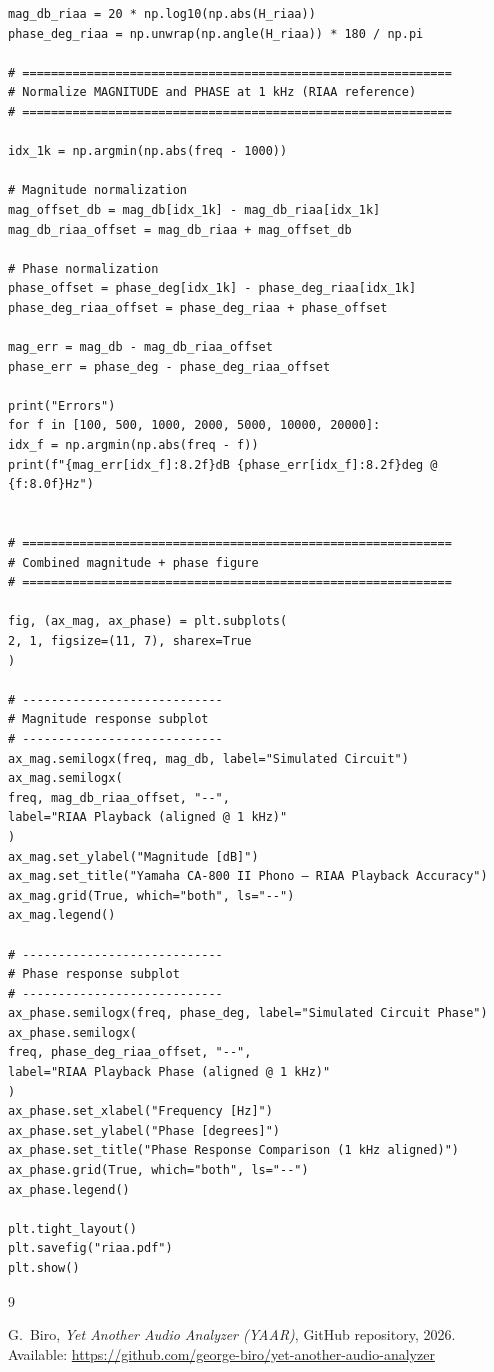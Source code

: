 \documentclass[]{article}
\begin{document}
\begin{verbatim}
mag_db_riaa = 20 * np.log10(np.abs(H_riaa))
phase_deg_riaa = np.unwrap(np.angle(H_riaa)) * 180 / np.pi

# ============================================================
# Normalize MAGNITUDE and PHASE at 1 kHz (RIAA reference)
# ============================================================

idx_1k = np.argmin(np.abs(freq - 1000))

# Magnitude normalization
mag_offset_db = mag_db[idx_1k] - mag_db_riaa[idx_1k]
mag_db_riaa_offset = mag_db_riaa + mag_offset_db

# Phase normalization
phase_offset = phase_deg[idx_1k] - phase_deg_riaa[idx_1k]
phase_deg_riaa_offset = phase_deg_riaa + phase_offset

mag_err = mag_db - mag_db_riaa_offset
phase_err = phase_deg - phase_deg_riaa_offset

print("Errors")
for f in [100, 500, 1000, 2000, 5000, 10000, 20000]:
idx_f = np.argmin(np.abs(freq - f))
print(f"{mag_err[idx_f]:8.2f}dB {phase_err[idx_f]:8.2f}deg @ {f:8.0f}Hz") 


# ============================================================
# Combined magnitude + phase figure
# ============================================================

fig, (ax_mag, ax_phase) = plt.subplots(
2, 1, figsize=(11, 7), sharex=True
)

# ----------------------------
# Magnitude response subplot
# ----------------------------
ax_mag.semilogx(freq, mag_db, label="Simulated Circuit")
ax_mag.semilogx(
freq, mag_db_riaa_offset, "--",
label="RIAA Playback (aligned @ 1 kHz)"
)
ax_mag.set_ylabel("Magnitude [dB]")
ax_mag.set_title("Yamaha CA-800 II Phono – RIAA Playback Accuracy")
ax_mag.grid(True, which="both", ls="--")
ax_mag.legend()

# ----------------------------
# Phase response subplot
# ----------------------------
ax_phase.semilogx(freq, phase_deg, label="Simulated Circuit Phase")
ax_phase.semilogx(
freq, phase_deg_riaa_offset, "--",
label="RIAA Playback Phase (aligned @ 1 kHz)"
)
ax_phase.set_xlabel("Frequency [Hz]")
ax_phase.set_ylabel("Phase [degrees]")
ax_phase.set_title("Phase Response Comparison (1 kHz aligned)")
ax_phase.grid(True, which="both", ls="--")
ax_phase.legend()

plt.tight_layout()
plt.savefig("riaa.pdf")
plt.show()
\end{verbatim}

\begin{thebibliography}{9}

G.~Biro, \textit{Yet Another Audio Analyzer (YAAR)}, GitHub repository, 2026. Available: \url{https://github.com/george-biro/yet-another-audio-analyzer}
\end{thebibliography}
\end{document}
